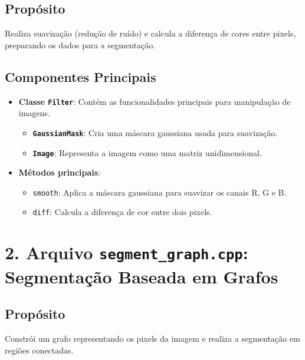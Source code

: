 \documentclass[12pt]{article}
\begin{document}
\subsection*{Propósito}
Realiza suavização (redução de ruído) e calcula a diferença de cores entre pixels, preparando os dados para a segmentação.

\subsection*{Componentes Principais}
\begin{itemize}
    \item \textbf{Classe \texttt{Filter}}:
    Contém as funcionalidades principais para manipulação de imagens.
    \begin{itemize}
        \item \textbf{\texttt{GaussianMask}}: Cria uma máscara gaussiana usada para suavização.
        \item \textbf{\texttt{Image}}: Representa a imagem como uma matriz unidimensional.
    \end{itemize}
    \item \textbf{Métodos principais}:
    \begin{itemize}
        \item \texttt{smooth}: Aplica a máscara gaussiana para suavizar os canais R, G e B.
        \item \texttt{diff}: Calcula a diferença de cor entre dois pixels.
    \end{itemize}
\end{itemize}

\section*{2. Arquivo \texttt{segment\_graph.cpp}: Segmentação Baseada em Grafos}
\subsection*{Propósito}
Constrói um grafo representando os pixels da imagem e realiza a segmentação em regiões conectadas.
\end{document}
